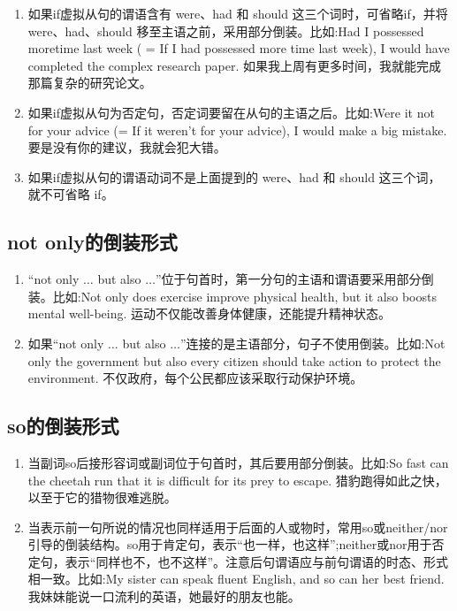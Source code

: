 \begin{enumerate}
  \item 如果if虚拟从句的谓语含有 were、had 和 should 这三个词时，可省略if，并将 were、had、should 移至主语之前，采用部分倒装。比如:Had I possessed moretime last week ( = If I had possessed more time last week), I would have completed the complex research paper. 如果我上周有更多时间，我就能完成那篇复杂的研究论文。
  \item 如果if虚拟从句为否定句，否定词要留在从句的主语之后。比如:Were it not for your advice (= If it weren't for your advice), I would make a big mistake. 要是没有你的建议，我就会犯大错。
  \item 如果if虚拟从句的谓语动词不是上面提到的 were、had 和 should 这三个词，就不可省略 if。
\end{enumerate}

\subsection{not only的倒装形式}

\begin{enumerate}
  \item “not only \(\ldots\) but also \(\ldots\)”位于句首时，第一分句的主语和谓语要采用部分倒装。比如:Not only does exercise improve physical health, but it also boosts mental well-being. 运动不仅能改善身体健康，还能提升精神状态。
  \item 如果“not only \(\ldots\) but also \(\ldots\)”连接的是主语部分，句子不使用倒装。比如:Not only the government but also every citizen should take action to protect the environment. 不仅政府，每个公民都应该采取行动保护环境。
\end{enumerate}

\subsection{so的倒装形式}

\begin{enumerate}
  \item 当副词so后接形容词或副词位于句首时，其后要用部分倒装。比如:So fast can the cheetah run that it is difficult for its prey to escape. 猎豹跑得如此之快，以至于它的猎物很难逃脱。
  \item 当表示前一句所说的情况也同样适用于后面的人或物时，常用so或neither/nor引导的倒装结构。so用于肯定句，表示“也一样，也这样”;neither或nor用于否定句，表示“同样也不，也不这样”。注意后句谓语应与前句谓语的时态、形式相一致。比如:My sister can speak fluent English, and so can her best friend. 我妹妹能说一口流利的英语，她最好的朋友也能。
\end{enumerate}

